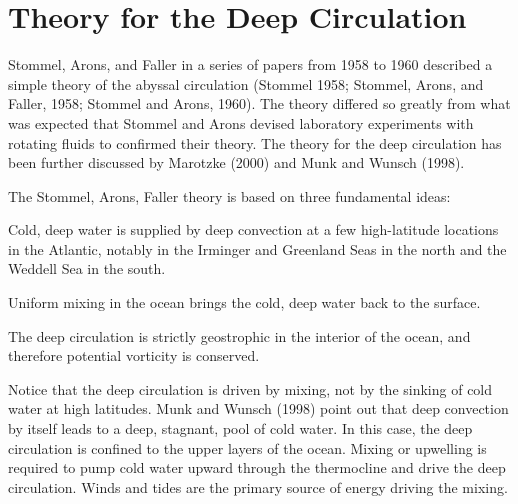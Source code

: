 \section{Theory for the Deep Circulation}
Stommel, Arons, and Faller in a series of papers from 1958 to 1960 described a simple theory of the abyssal circulation (Stommel 1958; Stommel, Arons, and Faller, 1958; Stommel and Arons, 1960). The theory differed so greatly from what was expected that Stommel and Arons devised laboratory experiments with rotating fluids to confirmed their theory. The theory for the deep circulation has been further discussed by Marotzke (2000) and Munk and Wunsch (1998).

The Stommel, Arons, Faller theory is based on three
fundamental ideas:
\begin{enumerate}

\vitem Cold, deep water is supplied by deep convection at a few high-latitude
locations in the Atlantic, notably in the Irminger and Greenland Seas in the
north and the Weddell Sea in the south.

\vitem Uniform mixing in the ocean brings the cold, deep water
back to the surface.

\vitem The deep circulation is strictly geostrophic in the interior of the ocean, and therefore potential vorticity is conserved.
\end{enumerate}

Notice that the deep circulation is driven by mixing, not by the sinking of cold water at high latitudes. Munk and Wunsch (1998)
point out that deep convection by itself leads to a deep, stagnant, pool of cold
water. In this case, the deep circulation is confined to the upper layers of
the ocean. Mixing or upwelling is required to pump cold
water upward through the thermocline
and drive the deep circulation. Winds and tides are the primary source of energy driving the
mixing.

